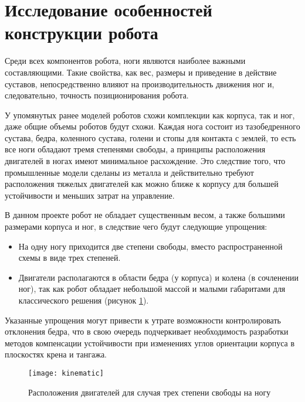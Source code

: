 \section{Исследование особенностей конструкции робота}\label{C1_2}
Среди всех компонентов робота, ноги являются наиболее важными составляющими. Такие свойства, как вес, размеры и приведение в действие суставов, непосредственно влияют на производительность движения ног и, следовательно, точность позиционирования робота.

У упомянутых ранее моделей роботов схожи комплекции как корпуса, так и ног, даже общие объемы роботов будут схожи. 
Каждая нога состоит из тазобедренного сустава, бедра, коленного сустава, голени и стопы для контакта с землей, то есть все ноги обладают тремя степенями свободы, а принципы расположения двигателей в ногах имеют минимальное расхождение. Это следствие того, что промышленные модели сделаны из металла и действительно требуют расположения тяжелых двигателей как можно ближе к корпусу для большей устойчивости и меньших затрат на управление. 

В данном проекте робот не обладает существенным весом, а также большими размерами корпуса и ног, в следствие чего будут следующие упрощения:
\begin{itemize}
	\item На одну ногу приходится две степени свободы, вместо распространенной схемы в виде трех степеней.
	\item Двигатели располагаются в области бедра (у корпуса) и колена (в сочленении ног), так как робот обладает небольшой массой и малыми габаритами для классического решения (рисунок \ref{kinematic}).
\end{itemize}


Указанные упрощения могут привести к утрате возможности контролировать отклонения бедра, что в свою очередь подчеркивает необходимость разработки методов компенсации устойчивости при изменениях углов ориентации корпуса в плоскостях крена и тангажа.
\newpage
\begin{figure}[h]
	\begin{center}
		\texttt{[image: kinematic]}
		\caption{Расположения двигателей для случая трех степени свободы на ногу}
		\label{kinematic}
	\end{center}
\end{figure}
